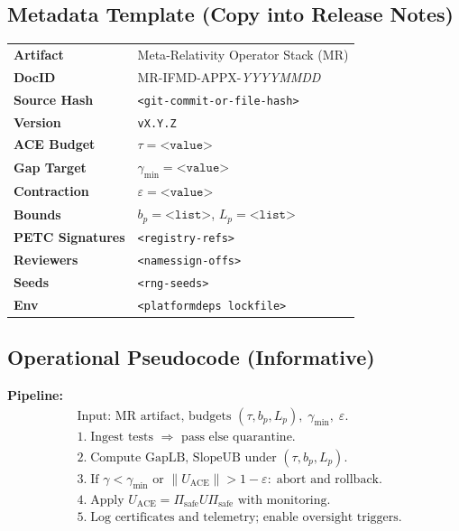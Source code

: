 \documentclass[12]{amsart}
\theoremstyle{plain}
\begin{document}
\subsection*{Metadata Template (Copy into Release Notes)}
\begin{tabular}{@{}ll@{}}
\textbf{Artifact} & Meta‑Relativity Operator Stack (MR) \\
\textbf{DocID} & MR-IFMD-APPX-\textit{YYYYMMDD} \\
\textbf{Source Hash} & \texttt{<git-commit-or-file-hash>} \\
\textbf{Version} & \texttt{vX.Y.Z} \\
\textbf{ACE Budget} & \(\tau=\texttt{<value>}\) \\
\textbf{Gap Target} & \(\gamma_{\min}=\texttt{<value>}\) \\
\textbf{Contraction} & \(\varepsilon=\texttt{<value>}\) \\
\textbf{Bounds} & \(b_p=\texttt{<list>}\), \(L_p=\texttt{<list>}\) \\
\textbf{PETC Signatures} & \texttt{<registry-refs>} \\
\textbf{Reviewers} & \texttt{<names\/sign-offs>} \\
\textbf{Seeds} & \texttt{<rng-seeds>} \\
\textbf{Env} & \texttt{<platform\/deps lockfile>} \\
\end{tabular}


\subsection*{Operational Pseudocode (Informative)}
\noindent\textbf{Pipeline:}
\begin{align*}
&\text{Input: MR artifact, budgets } (\tau, b_p, L_p),\; \gamma_{\min},\; \varepsilon.\\
&1.\; \text{Ingest tests }\Rightarrow \text{ pass else quarantine}.\\
&2.\; \text{Compute GapLB, SlopeUB under } (\tau, b_p, L_p).\\
&3.\; \text{If } \gamma\!<\!\gamma_{\min} \text{ or } \|U_{\mathrm{ACE}}\|\!>\!1-\varepsilon:\; \text{abort and rollback}.\\
&4.\; \text{Apply } U_{\mathrm{ACE}} = \Pi_{\mathrm{safe}} U \Pi_{\mathrm{safe}} \text{ with monitoring}.\\
&5.\; \text{Log certificates and telemetry; enable oversight triggers}.
\end{align*}
\end{document}
